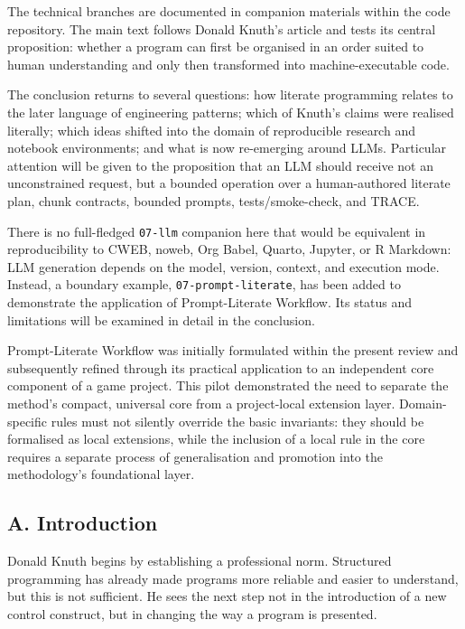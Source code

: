 \documentclass{ZGJournalArticle_2026}
\begin{document}
The technical branches are documented in companion materials within the
code repository. The main text follows Donald Knuth's article and tests
its central proposition: whether a program can first be organised in an
order suited to human understanding and only then transformed into
machine-executable code.

The conclusion returns to several questions: how literate programming
relates to the later language of engineering patterns; which of Knuth's
claims were realised literally; which ideas shifted into the domain of
reproducible research and notebook environments; and what is now
re-emerging around LLMs. Particular attention will be given to the
proposition that an LLM should receive not an unconstrained request, but
a bounded operation over a human-authored literate plan, chunk
contracts, bounded prompts, tests/smoke-check, and TRACE.

There is no full-fledged \texttt{07-llm} companion here that would be
equivalent in reproducibility to CWEB, noweb, Org Babel, Quarto,
Jupyter, or R Markdown: LLM generation depends on the model, version,
context, and execution mode. Instead, a boundary example,
\texttt{07-prompt-literate}, has been added to demonstrate the
application of Prompt-Literate Workflow. Its status and limitations will
be examined in detail in the conclusion.

Prompt-Literate Workflow was initially formulated within the present
review and subsequently refined through its practical application to an
independent core component of a game project. This pilot demonstrated
the need to separate the method's compact, universal core from a
project-local extension layer. Domain-specific rules must not silently
override the basic invariants: they should be formalised as local
extensions, while the inclusion of a local rule in the core requires a
separate process of generalisation and promotion into the methodology's
foundational layer.

\subsection{A. Introduction}\label{a.-introduction}

Donald Knuth begins by establishing a professional norm. Structured
programming has already made programs more reliable and easier to
understand, but this is not sufficient. He sees the next step not in the
introduction of a new control construct, but in changing the way a
program is presented.
\end{document}
